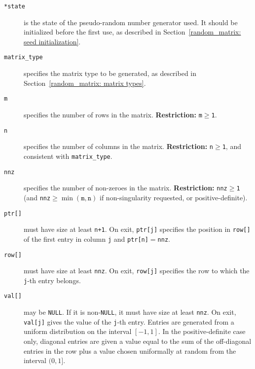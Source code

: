 \vspace*{-3mm}
\begin{description}

\item[\texttt{*state}] is the state of the pseudo-random number generator used.
   It should be initialized before the first use, as described in
   Section~\ref{random_matrix: seed initialization}.

\item[\texttt{matrix\_type}] specifies the matrix type to be generated, as
   described in Section~\ref{random_matrix: matrix types}.

\item[\texttt{m}] specifies the number of rows in the matrix.
{\bf Restriction:} {\tt m$\geq$1}.

\item[\texttt{n}] specifies the number of columns in the matrix.
{\bf Restriction:} {\tt n$\geq$1}, and consistent with \texttt{matrix\_type}.

\item[\texttt{nnz}] specifies the number of non-zeroes in the matrix.
{\bf Restriction:} {\tt nnz$\geq$1} (and \texttt{nnz}$\geq\min(\texttt{m},\texttt{n})$ if non-singularity requested, or positive-definite).

\item[\texttt{ptr[]}] must have size at least {\tt n+1}. On exit, {\tt ptr[j]}
   specifies the position in {\tt row[]}
   of the first entry in column {\tt j} and {\tt ptr[n]$=$nnz}.

\item[\texttt{row[]}] must have size at least {\tt nnz}. On exit, {\tt row[j]}
   specifies the row to which the {\tt j}-th entry belongs.

\item[\texttt{val[]}] may be \texttt{NULL}. If it is non-\texttt{NULL}, it must
   have size at least \texttt{nnz}. On exit, \texttt{val[j]} gives
   the value of the \texttt{j}-th entry. Entries are generated from a uniform
   distribution on the interval $[-1,1]$. In the positive-definite case only,
   diagonal entries are given a value equal to the sum of the off-diagonal
   entries in the row plus a value chosen uniformally at random from the
   interval $(0,1]$.


\end{description}
